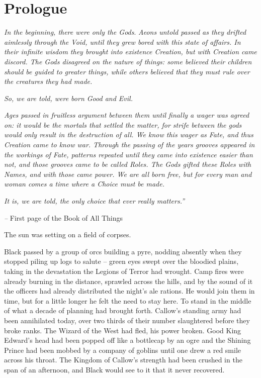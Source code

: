 \documentclass[12pt, openany]{book}
\begin{document}
\chapter{Prologue}

\textit{In the beginning, there were only the Gods}.
\textit{Aeons untold passed as they drifted aimlessly through the Void, until they grew bored with this state of affairs. In their infinite wisdom they brought into existence Creation, but with Creation came discord. The Gods disagreed on the nature of things: some believed their children should be guided to greater things, while others believed that t}\textit{hey must rule over the creatures they had made.}

\textit{So, we are told, were born Good and Evil.}

\textit{Ages passed in fruitless argument between them until finally a wager was agreed on: it would be the mortals that settled the matter, for strife between the gods would only result in the destruction of all. We know this wager as Fate, and thus Creation came to know war. Through the passing of the years grooves appeared in the workings of Fate, patterns repeated until they came into existence easier than not, and those grooves came to be called Roles. The Gods gifted these Roles with Names, and with those came power. We are all born free, but for every man and woman comes a time where a Choice must be made. }

\textit{It is, we are told, the only choice that ever really matters.”}

\textit{– }First page of the Book of All Things

The sun was setting on a field of corpses.

Black passed by a group of orcs building a pyre, nodding absently when they stopped piling up logs to salute – green eyes swept over the bloodied plains, taking in the devastation the Legions of Terror had wrought. Camp fires were already burning in the distance, sprawled across the hills, and by the sound of it the officers had already distributed the night’s ale rations. He would join them in time, but for a little longer he felt the need to stay here. To stand in the middle of what a decade of planning had brought forth. Callow’s standing army had been annihilated today, over two thirds of their number slaughtered before they broke ranks. The Wizard of the West had fled, his power broken. Good King Edward’s head had been popped off like a bottlecap by an ogre and the Shining Prince had been mobbed by a company of goblins until one drew a red smile across his throat. The Kingdom of Callow’s strength had been crushed in the span of an afternoon, and Black would see to it that it never recovered.
\end{document}
